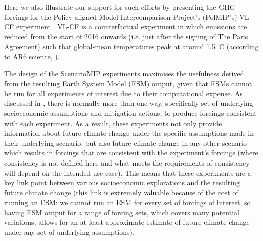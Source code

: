 Here we also illustrate our support for such efforts by presenting the GHG forcings
for the Policy-aligned Model Intercomparison Project's (PolMIP's) \citep{tbd_polmip-guidance_2026}
VL-CF experiment \citep{hogner_vl-cf-emissions_2026}.
VL-CF is a counterfactual experiment in which emissions are reduced from the start of 2016 onwards (i.e. just after the signing of The Paris Agreement)
such that global-mean temperatures peak at around 1.5~\textdegree C (according to AR6 science, \citealp{IPCC_AR6-WG1-Ch-7_2021,kikstra_ar6-climate-assessment_2022}).

The design of the ScenarioMIP experiments maximises the usefulness derived from the resulting Earth System Model (ESM) output,
given that ESMs cannot be run for all experiments of interest due to their computational expense.
As discussed in \citet{riahi_ssps_2017}, there is normally more than one way,
specifically set of underlying socioeconomic assumptions and mitigation actions,
to produce forcings consistent with each experiment.
As a result, these experiments not only provide information about future climate change
under the specific assumptions made in their underlying scenario,
but also future climate change in any other scenario
which results in forcings that are consistent with the experiment's forcings
(where consistency is not defined here and what meets the requirements of consistency will depend on the intended use case).
This means that these experiments are a key link point between various socioeconomic explorations
and the resulting future climate change
(this link is extremely valuable because of the cost of running an ESM: we cannot run an ESM for every set of forcings of interest,
so having ESM output for a range of forcing sets, which covers many potential variations,
allows for an at least approximate estimate of future climate change under any set of underlying assumptions).

